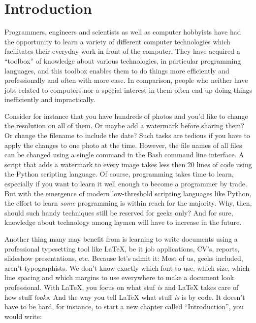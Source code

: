 \chapter{Introduction}
Programmers, engineers and scientists as well as computer hobbyists have had the opportunity to learn a variety of different computer technologies which facilitates their everyday work in front of the computer. They have acquired a ``toolbox'' of knowledge about various technologies, in particular programming languages, and this toolbox enables them to do things more efficiently and professionally and often with more ease. In comparison, people who neither have jobs related to computers nor a special interest in them often end up doing things inefficiently and impractically.

Consider for instance that you have hundreds of photos and you’d like to change the resolution on all of them. Or maybe add a watermark before sharing them? Or change the filename to include the date? Such tasks are tedious if you have to apply the changes to one photo at the time. However, the file names of all files can be changed using a single command in the Bash command line interface. A script that adds a watermark to every image takes less then 20 lines of code using the Python scripting language. Of course, programming takes time to learn, especially if you want to learn it well enough to become a programmer by trade. But with the emergence of modern low-threshold scripting languages like Python, the effort to learn \emph{some} programming is within reach for the majority. Why, then, should such handy techniques still be reserved for geeks only? And for sure, knowledge about technology among laymen will have to increase in the future.

Another thing many may benefit from is learning to write documents using a professional typesetting tool like \LaTeX, be it job applications, CV’s, reports, slideshow presentations, etc. Because let’s admit it: Most of us, geeks included, aren’t typographists. We don’t know exactly which font to use, which size, which line spacing and which margins to use everywhere to make a document look professional. With \LaTeX{}, you focus on what stuf \emph{is} and \LaTeX{} takes care of how stuff \emph{looks}. And the way you tell \LaTeX{} what stuff \emph{is} is by code. It doesn't have to be hard, for instance, to start a new chapter called ``Introduction'', you would write:


